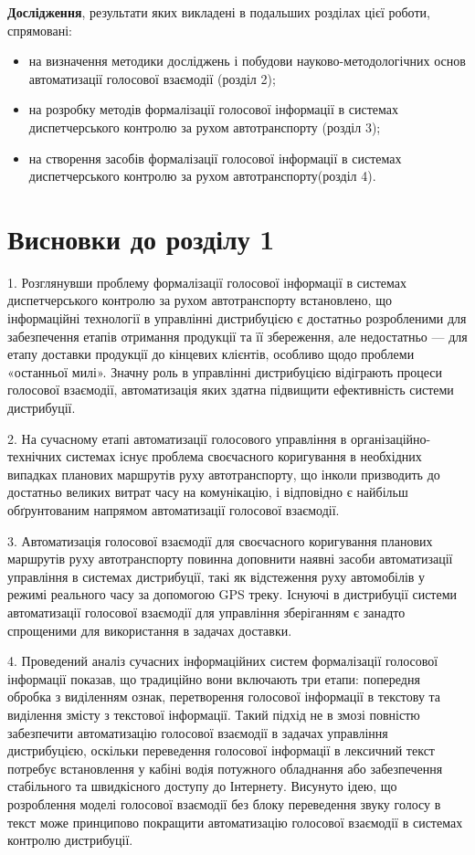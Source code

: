 \textbf{Дослідження}, результати яких викладені в подальших розділах цієї роботи, спрямовані:

\begin{itemize}
	\item на визначення методики досліджень і побудови науково-методологічних основ автоматизації голосової взаємодії (розділ 2);
	\item на розробку методів формалізації голосової інформації в системах диспетчерського контролю за рухом автотранспорту (розділ 3);
	\item на створення засобів формалізації голосової інформації в системах диспетчерського контролю за рухом автотранспорту(розділ 4).
\end{itemize}

\section*{Висновки до розділу 1}

1. Розглянувши проблему формалізації голосової інформації в системах диспетчерського контролю за рухом автотранспорту встановлено, що інформаційні технології в управлінні дистрибуцією є достатньо розробленими для забезпечення етапів отримання продукції та її збереження, але недостатньо --- для етапу доставки продукції до кінцевих клієнтів, особливо щодо проблеми «останньої милі». Значну роль в управлінні дистрибуцією відіграють процеси голосової взаємодії, автоматизація яких здатна підвищити ефективність системи дистрибуції.

2. На сучасному етапі автоматизації голосового управління в організаційно-технічних системах існує проблема своєчасного коригування в необхідних випадках планових маршрутів руху автотранспорту, що інколи призводить до достатньо великих витрат часу на комунікацію, і відповідно є найбільш обґрунтованим напрямом автоматизації голосової взаємодії.

3. Автоматизація голосової взаємодії для своєчасного коригування планових маршрутів руху автотранспорту повинна доповнити наявні засоби автоматизації управління в системах дистрибуції, такі як відстеження руху автомобілів у режимі реального часу за допомогою GPS треку. Існуючі в дистрибуції системи автоматизації голосової взаємодії для управління зберіганням є занадто спрощеними для використання в задачах доставки.

4. Проведений аналіз сучасних інформаційних систем формалізації голосової інформації показав, що традиційно вони включають три етапи: попередня обробка з виділенням ознак, перетворення голосової інформації в текстову та виділення змісту з текстової інформації. Такий підхід не в змозі повністю забезпечити автоматизацію голосової взаємодії в задачах управління дистрибуцією, оскільки переведення голосової інформації в лексичний текст потребує встановлення у кабіні водія потужного обладнання або забезпечення стабільного та швидкісного доступу до Інтернету. Висунуто ідею, що розроблення моделі голосової взаємодії без блоку переведення звуку голосу в текст може принципово покращити автоматизацію голосової взаємодії в системах контролю дистрибуції.

